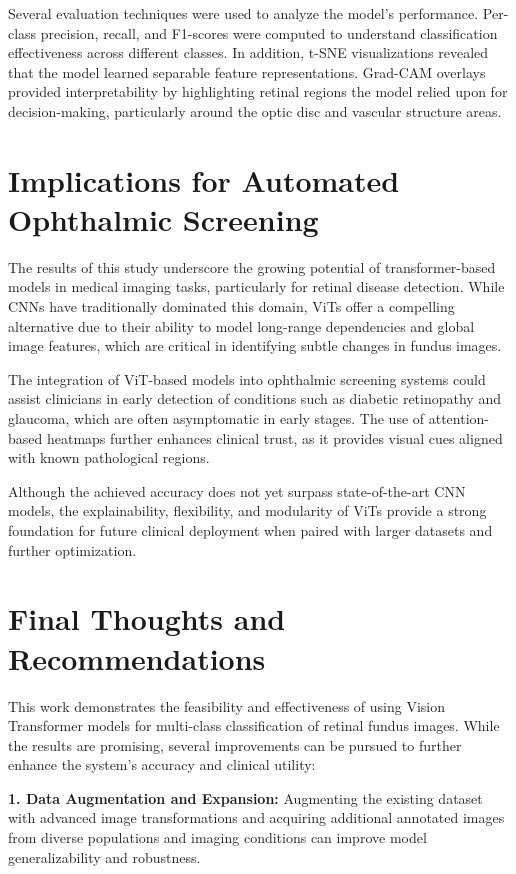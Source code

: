\documentclass[a4paper,12pt]{report}
\begin{document}
Several evaluation techniques were used to analyze the model’s performance. Per-class precision, recall, and F1-scores were computed to understand classification effectiveness across different classes. In addition, t-SNE visualizations revealed that the model learned separable feature representations. Grad-CAM overlays provided interpretability by highlighting retinal regions the model relied upon for decision-making, particularly around the optic disc and vascular structure areas.

\section{Implications for Automated Ophthalmic Screening}

The results of this study underscore the growing potential of transformer-based models in medical imaging tasks, particularly for retinal disease detection. While CNNs have traditionally dominated this domain, ViTs offer a compelling alternative due to their ability to model long-range dependencies and global image features, which are critical in identifying subtle changes in fundus images.

The integration of ViT-based models into ophthalmic screening systems could assist clinicians in early detection of conditions such as diabetic retinopathy and glaucoma, which are often asymptomatic in early stages. The use of attention-based heatmaps further enhances clinical trust, as it provides visual cues aligned with known pathological regions.

Although the achieved accuracy does not yet surpass state-of-the-art CNN models, the explainability, flexibility, and modularity of ViTs provide a strong foundation for future clinical deployment when paired with larger datasets and further optimization.

\section{Final Thoughts and Recommendations}

This work demonstrates the feasibility and effectiveness of using Vision Transformer models for multi-class classification of retinal fundus images. While the results are promising, several improvements can be pursued to further enhance the system’s accuracy and clinical utility:

\textbf{1. Data Augmentation and Expansion:} Augmenting the existing dataset with advanced image transformations and acquiring additional annotated images from diverse populations and imaging conditions can improve model generalizability and robustness.
\end{document}
